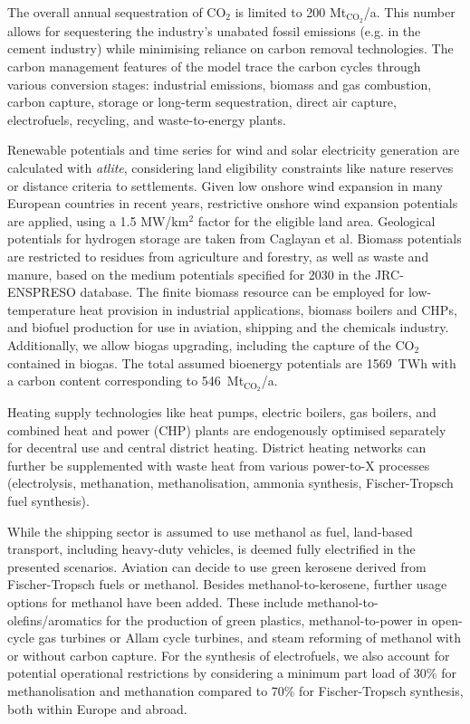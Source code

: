 The overall annual sequestration of CO$_2$ is limited to 200
Mt$_{\text{CO}_2}$/a. This number allows for sequestering the industry's
unabated fossil emissions (e.g. in the cement industry) while minimising
reliance on carbon removal technologies. The carbon management features of the
model trace the carbon cycles through various conversion stages: industrial
emissions, biomass and gas combustion, carbon capture, storage or long-term
sequestration, direct air capture, electrofuels, recycling, and waste-to-energy
plants.

Renewable potentials and time series for wind and solar electricity generation
are calculated with \textit{atlite},\cite{hofmannAtliteLightweight2021}
considering land eligibility constraints like nature reserves or distance
criteria to settlements. Given low onshore wind expansion in many European
countries in recent years,\cite{ourworldindataInstalledWind2023} restrictive
onshore wind expansion potentials are applied, using a 1.5 MW/km$^2$ factor for
the eligible land area. Geological potentials for hydrogen storage are taken
from Caglayan et al.\cite{caglayanTechnicalPotential2020} Biomass potentials are
restricted to residues from agriculture and forestry, as well as waste and
manure, based on the medium potentials specified for 2030 in the JRC-ENSPRESO
database.\cite{ruizENSPRESOOpen2019} The finite biomass resource can be employed
for low-temperature heat provision in industrial applications, biomass boilers
and CHPs, and biofuel production for use in aviation, shipping and the chemicals
industry. Additionally, we allow biogas upgrading, including the capture of the
CO$_2$ contained in biogas. The total assumed bioenergy potentials are 1569~TWh
with a carbon content corresponding to 546~Mt$_{\text{CO}_2}$/a.

Heating supply technologies like heat pumps, electric boilers, gas boilers, and
combined heat and power (CHP) plants are endogenously optimised separately for
decentral use and central district heating. District heating networks can
further be supplemented with waste heat from various power-to-X processes
(electrolysis, methanation, methanolisation, ammonia synthesis, Fischer-Tropsch
fuel synthesis).

While the shipping sector is assumed to use methanol as fuel, land-based
transport, including heavy-duty vehicles, is deemed fully electrified in the
presented scenarios. Aviation can decide to use green kerosene derived from
Fischer-Tropsch fuels or methanol. Besides methanol-to-kerosene, further
usage options for methanol have been added.
These include
methanol-to-olefins/aromatics for the production of green plastics,
methanol-to-power\cite{brownUltralongdurationEnergyStorage2023} in open-cycle gas
turbines or Allam cycle turbines, and steam reforming of methanol with or
without carbon capture. For the synthesis of electrofuels, we also account for
potential operational restrictions by considering a minimum part load of 30\%
for methanolisation and methanation compared to 70\% for Fischer-Tropsch
synthesis, both within Europe and abroad.

